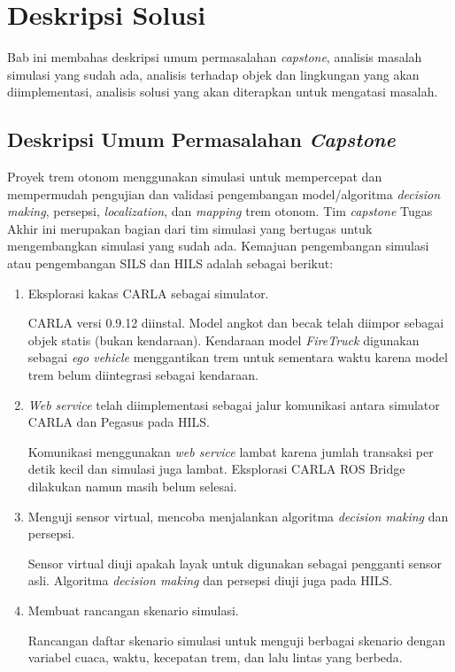 \chapter{Deskripsi Solusi}
\label{chapter-3}

Bab ini membahas deskripsi umum permasalahan \textit{capstone}, analisis masalah
simulasi yang sudah ada, analisis terhadap objek dan lingkungan yang akan
diimplementasi, analisis solusi yang akan diterapkan untuk mengatasi masalah.

\section{Deskripsi Umum Permasalahan \textit{Capstone}}

Proyek trem otonom menggunakan simulasi untuk mempercepat dan mempermudah
pengujian dan validasi pengembangan model/algoritma \textit{decision making},
persepsi, \textit{localization}, dan \textit{mapping} trem otonom. Tim
\textit{capstone} Tugas Akhir ini merupakan bagian dari tim simulasi yang
bertugas untuk mengembangkan simulasi yang sudah ada. Kemajuan
pengembangan simulasi atau pengembangan SILS dan HILS adalah sebagai berikut:

\begin{enumerate}

	\item Eksplorasi kakas CARLA sebagai simulator.

	CARLA versi 0.9.12 diinstal. Model angkot dan becak telah diimpor
	sebagai objek statis (bukan kendaraan). Kendaraan model \textit{FireTruck}
	digunakan sebagai \textit{ego vehicle} menggantikan trem untuk sementara
	waktu karena model trem belum diintegrasi sebagai kendaraan.

	\item \textit{Web service} telah diimplementasi sebagai jalur komunikasi
	antara simulator CARLA dan Pegasus pada HILS.

	Komunikasi menggunakan \textit{web service} lambat karena jumlah transaksi
	per detik kecil dan simulasi juga lambat. Eksplorasi CARLA ROS Bridge
	dilakukan namun masih belum selesai.

	\item Menguji sensor virtual, mencoba menjalankan algoritma \textit{decision
	making} dan persepsi.

	Sensor virtual diuji apakah layak untuk digunakan sebagai pengganti sensor
	asli. Algoritma \textit{decision making} dan persepsi diuji juga pada HILS.

	\item Membuat rancangan skenario simulasi.

	Rancangan daftar skenario simulasi untuk menguji berbagai skenario dengan
	variabel cuaca, waktu, kecepatan trem, dan lalu lintas yang berbeda.

\end{enumerate}


